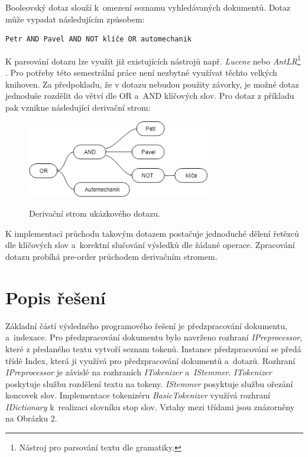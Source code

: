 \documentclass[12pt, a4paper]{article}
\begin{document}
Booleovský dotaz slouží k~omezení seznamu vyhledávaných dokumentů. Dotaz může vypadat následujícím způsobem:
\begin{verbatim}
Petr AND Pavel AND NOT klíče OR automechanik
\end{verbatim} 
K parsování dotazu lze využít již existujících nástrojů např. \emph{Lucene} nebo \emph{AntLR}\footnote{Nástroj pro parsování textu dle gramatiky.} . Pro potřeby této semestrální práce není nezbytné využívat těchto velkých knihoven. Za předpokladu, že v dotazu nebudou použity závorky, je možné dotaz jednoduše rozdělit do větví dle OR a~AND klíčových slov. Pro dotaz z příkladu pak vznikne následující derivační strom:

\begin{figure}[h!]
\centering
\includegraphics[bb= 0 0 385 162 , width=80mm]{boolean.png}
\label{fig:boolean}
\caption{Derivační strom ukázkového dotazu.}
\end{figure}

K implementaci průchodu takovým dotazem postačuje jednoduché dělení řetězců dle klíčových slov a~korektní slučování výsledků dle žádané operace. Zpracování dotazu probíhá pre-order průchodem derivačním stromem.

\newpage
\section{Popis řešení}

Základní částí výsledného programového řešení je předzpracování dokumentu, a~indexace. Pro předzpracování dokumentu bylo navrženo rozhraní \emph{IPreprocessor}, které z předaného textu vytvoří seznam tokenů. Instance předzpracování se předá třídě Index, která ji využívá pro předzpracování dokumentů a~dotazů. Rozhraní \emph{IPreprocessor} je závislé na rozhraních \emph{ITokenizer} a~\emph{IStemmer}. \emph{ITokenizer} poskytuje službu rozdělení textu na tokeny. \emph{IStemmer} posyktuje službu ořezání koncovek slov. Implementace tokenizéru \emph{BasicTokenizer} využívá rozhraní \emph{IDictionary} k~realizaci slovníku stop slov. Vztahy mezi třídami jsou znázorněny na Obrázku 2.
\end{document}
